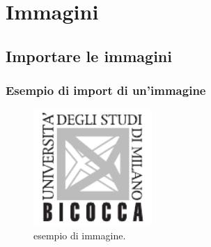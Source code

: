 \chapter{Immagini}
\section{Importare le immagini}
    \subsection{Esempio di import di un'immagine}
    
        \begin{figure}[h]
            \centering
            \includegraphics[width=0.4\textwidth]{assets/images/logo_unimib.pdf}
            \caption{esempio di immagine.}
            \label{fig:logo_unimib}
        \end{figure}
        \newpage
